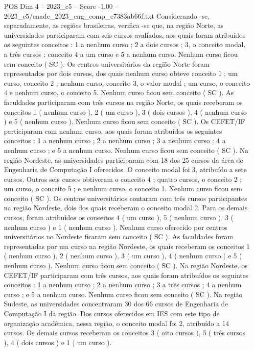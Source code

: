 \begin{textsample}{POS Dim 4 – 2023\_c5 – Score -1.00 – 2023\_c5/enade\_2023\_eng\_comp\_e7383ab66f.txt}
Considerando -se, separadamente, as regiões brasileiras, verifica -se que, na região Norte, as universidades participaram com seis cursos avaliados, aos quais foram atribuídos os seguintes conceitos : 1 a nenhum curso ; 2 a dois cursos ; 3, o conceito modal, a três cursos ; conceito 4 a um curso e 5 a nenhum curso.
Nenhum curso ficou sem conceito ( SC ).
Os centros universitários da região Norte foram representados por dois cursos, dos quais nenhum curso obteve conceito 1 ; um curso, conceito 2 ; nenhum curso, conceito 3, o valor modal ; um curso, o conceito 4 e nenhum curso, o conceito 5.
Nenhum curso ficou sem conceito ( SC ).
As faculdades participaram com três cursos na região Norte, os quais receberam os conceitos 1 ( nenhum curso ), 2 ( um curso ), 3 ( dois cursos ), 4 ( nenhum curso ) e 5 ( nenhum curso ).
Nenhum curso ficou sem conceito ( SC ).
Os CEFET/IF participaram com nenhum curso, aos quais foram atribuídos os seguintes conceitos : 1 a nenhum curso ; 2 a nenhum curso ; 3 a nenhum curso ; 4 a nenhum curso ; e 5 a nenhum curso.
Nenhum curso ficou sem conceito ( SC ).
Na região Nordeste, as universidades participaram com 18 dos 25 cursos da área de Engenharia de Computação I oferecidos.
O conceito modal foi 3, atribuído a sete cursos.
Outros seis cursos obtiveram o conceito 4 ; quatro cursos, o conceito 2 ; um curso, o conceito 5 ; e nenhum curso, o conceito 1.
Nenhum curso ficou sem conceito ( SC ).
Os centros universitários contaram com três cursos participantes na região Nordeste, dois dos quais receberam o conceito modal 2.
Para os demais cursos, foram atribuídos os conceitos 4 ( um curso ), 5 ( nenhum curso ), 3 ( nenhum curso ) e 1 ( nenhum curso ).
Nenhum curso oferecido por centros universitários no Nordeste ficaram sem conceito ( SC ).
As faculdades foram representadas por um curso na região Nordeste, os quais receberam os conceitos 1 ( nenhum curso ), 2 ( nenhum curso ), 3 ( um curso ), 4 ( nenhum curso ) e 5 ( nenhum curso ).
Nenhum curso ficou sem conceito ( SC ).
Na região Nordeste, os CEFET/IF participaram com três cursos, aos quais foram atribuídos os seguintes conceitos : 1 a nenhum curso ; 2 a nenhum curso ; 3 a três cursos ; 4 a nenhum curso ; e 5 a nenhum curso.
Nenhum curso ficou sem conceito ( SC ).
Na região Sudeste, as universidades concentraram 30 dos 66 cursos de Engenharia de Computação I da região.
Dos cursos oferecidos em IES com este tipo de organização acadêmica, nessa região, o conceito modal foi 2, atribuído a 14 cursos.
Os demais cursos receberam os conceitos 3 ( oito cursos ), 5 ( três cursos ), 4 ( dois cursos ) e 1 ( um curso ).

\end{textsample}
